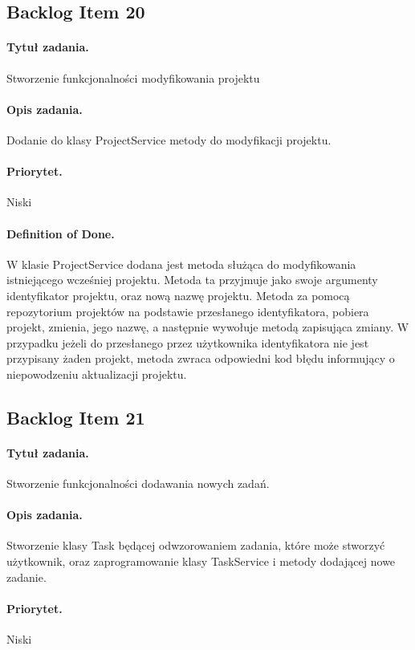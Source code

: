 \documentclass[a4paper]{article}
\begin{document}
\subsection{Backlog Item 20} 
\paragraph{Tytuł zadania.} Stworzenie funkcjonalności modyfikowania projektu
\paragraph{Opis zadania.} Dodanie do klasy ProjectService metody do modyfikacji projektu.
\paragraph{Priorytet.} Niski
\paragraph{Definition of Done.} W klasie ProjectService dodana jest metoda służąca do modyfikowania istniejącego wcześniej projektu. Metoda ta przyjmuje jako swoje argumenty identyfikator projektu, oraz nową nazwę projektu. Metoda za pomocą repozytorium projektów na podstawie przesłanego identyfikatora, pobiera projekt, zmienia, jego nazwę, a następnie wywołuje metodą zapisująca zmiany. W przypadku jeżeli do przesłanego przez użytkownika identyfikatora nie jest przypisany żaden projekt, metoda zwraca odpowiedni kod błędu informujący o niepowodzeniu aktualizacji projektu.

\subsection{Backlog Item 21} 
\paragraph{Tytuł zadania.}  Stworzenie funkcjonalności dodawania nowych zadań.
\paragraph{Opis zadania.} Stworzenie klasy Task będącej odwzorowaniem zadania, które może stworzyć użytkownik, oraz zaprogramowanie klasy TaskService i metody dodającej nowe zadanie.
\paragraph{Priorytet.} Niski
\end{document}
